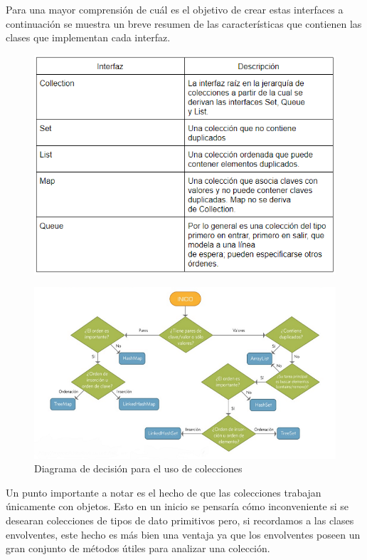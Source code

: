 \documentclass[12pt,a4paper]{report}
\begin{document}
{Para una mayor comprensión de cuál es el objetivo de crear estas interfaces a continuación se muestra un breve resumen de las características que contienen  las clases que implementan cada interfaz.
\begin{figure}[hbtp]
\centering
\includegraphics[scale=1]{tabla.PNG}
\end{figure}

\begin{figure}[hbtp]
\caption{Diagrama de decisión para el uso de colecciones}
\centering
\includegraphics[scale=0.6]{java.png}
\end{figure}
Un punto importante a notar es el hecho de que las colecciones trabajan únicamente con objetos. Esto en un inicio se pensaría cómo inconveniente si se desearan colecciones de tipos de dato primitivos pero, si recordamos a las clases envolventes, este hecho es más bien una ventaja ya que los envolventes poseen un gran conjunto de métodos útiles para analizar una colección. 

}
\end{document}

